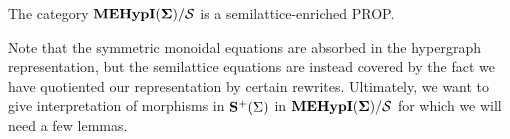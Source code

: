\begin{proposition}[Soundness]
\label{prop:soundness}
The category ${\mathbf{MEHypI(\Sigma)}}/{\mathcal{S}}$ is a semilattice-enriched PROP. 
\end{proposition}
Note that the symmetric monoidal equations are absorbed in the hypergraph representation,  but the semilattice equations are instead covered by the fact we have quotiented our representation by certain rewrites. 
Ultimately, we want to give interpretation of morphisms in $\mathbf{S}^{+}(\Sigma)$ in ${\mathbf{MEHypI(\Sigma)}} / \mathcal{S}$ for which we will need a few lemmas.




